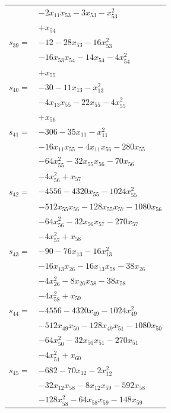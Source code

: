 \begin{longtable}{@{}r@{\;}l@{}}
 & \(\displaystyle -2x_{11}x_{53} -3x_{53} -x_{53}^{2}\) \\
 & \(\displaystyle +x_{54}\) \\[3pt]
\(s_{39}=\) & \(\displaystyle -12 -28x_{53} -16x_{53}^{2}\) \\
 & \(\displaystyle -16x_{53}x_{54} -14x_{54} -4x_{54}^{2}\) \\
 & \(\displaystyle +x_{55}\) \\[3pt]
\(s_{40}=\) & \(\displaystyle -30 -11x_{13} -x_{13}^{2}\) \\
 & \(\displaystyle -4x_{13}x_{55} -22x_{55} -4x_{55}^{2}\) \\
 & \(\displaystyle +x_{56}\) \\[3pt]
\(s_{41}=\) & \(\displaystyle -306 -35x_{11} -x_{11}^{2}\) \\
 & \(\displaystyle -16x_{11}x_{55} -4x_{11}x_{56} -280x_{55}\) \\
 & \(\displaystyle -64x_{55}^{2} -32x_{55}x_{56} -70x_{56}\) \\
 & \(\displaystyle -4x_{56}^{2} +x_{57}\) \\[3pt]
\(s_{42}=\) & \(\displaystyle -4556 -4320x_{55} -1024x_{55}^{2}\) \\
 & \(\displaystyle -512x_{55}x_{56} -128x_{55}x_{57} -1080x_{56}\) \\
 & \(\displaystyle -64x_{56}^{2} -32x_{56}x_{57} -270x_{57}\) \\
 & \(\displaystyle -4x_{57}^{2} +x_{58}\) \\[3pt]
\(s_{43}=\) & \(\displaystyle -90 -76x_{13} -16x_{13}^{2}\) \\
 & \(\displaystyle -16x_{13}x_{26} -16x_{13}x_{58} -38x_{26}\) \\
 & \(\displaystyle -4x_{26}^{2} -8x_{26}x_{58} -38x_{58}\) \\
 & \(\displaystyle -4x_{58}^{2} +x_{59}\) \\[3pt]
\(s_{44}=\) & \(\displaystyle -4556 -4320x_{49} -1024x_{49}^{2}\) \\
 & \(\displaystyle -512x_{49}x_{50} -128x_{49}x_{51} -1080x_{50}\) \\
 & \(\displaystyle -64x_{50}^{2} -32x_{50}x_{51} -270x_{51}\) \\
 & \(\displaystyle -4x_{51}^{2} +x_{60}\) \\[3pt]
\(s_{45}=\) & \(\displaystyle -682 -70x_{12} -2x_{12}^{2}\) \\
 & \(\displaystyle -32x_{12}x_{58} -8x_{12}x_{59} -592x_{58}\) \\
 & \(\displaystyle -128x_{58}^{2} -64x_{58}x_{59} -148x_{59}\) \\

\end{longtable}
